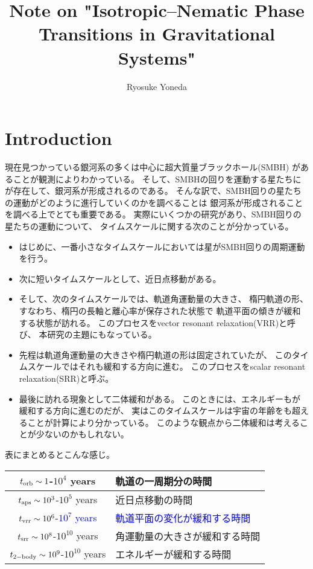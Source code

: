 \documentclass[10pt, pre, twocolumn, showpacs, aps]{revtex4-1}
\newcommand{\blue}[1]{\textcolor{blue}{#1}}
\begin{document}
\title{Note on "Isotropic--Nematic Phase Transitions in Gravitational Systems"}
\author{Ryosuke Yoneda}
\maketitle

\section{Introduction}
現在見つかっている銀河系の多くは中心に超大質量ブラックホール(SMBH)
があることが観測によりわかっている。
そして、SMBHの回りを運動する星たちにが存在して、銀河系が形成されるのである。
そんな訳で、SMBH回りの星たちの運動がどのように進行していくのかを調べることは
銀河系が形成されることを調べる上でとても重要である。
実際にいくつかの研究があり、SMBH回りの星たちの運動について、
タイムスケールに関する次のことが分かっている。
\begin{itemize}
\item はじめに、一番小さなタイムスケールにおいては星がSMBH回りの周期運動を行う。
\item 次に短いタイムスケールとして、近日点移動がある。
\item そして、次のタイムスケールでは、軌道角運動量の大きさ、
楕円軌道の形、すなわち、楕円の長軸と離心率が保存された状態で
軌道平面の傾きが緩和する状態が訪れる。
このプロセスをvector resonant relaxation(VRR)と呼び、
本研究の主題にもなっている。
\item 先程は軌道角運動量の大きさや楕円軌道の形は固定されていたが、	
このタイムスケールではそれも緩和する方向に進む。
このプロセスをscalar resonant relaxation(SRR)と呼ぶ。
\item 最後に訪れる現象として二体緩和がある。
このときには、エネルギーもが緩和する方向に進むのだが、
実はこのタイムスケールは宇宙の年齢をも超えることが計算により分かっている。
このような観点から二体緩和は考えることが少ないのかもしれない。	
\end{itemize}
表にまとめるとこんな感じ。
\begin{table}[H]
\begin{tabular}{|c|l|}\hline
	$t_{\rm orb}\sim1$-$10^4$ years & 軌道の一周期分の時間\\ \hline
	$t_{\rm aps}\sim10^3$-$10^5$ years & 近日点移動の時間\\ \hline
	\blue{$t_{\rm vrr}\sim10^6$-$10^7$ years} & \blue{軌道平面の変化が緩和する時間}\\ \hline
	$t_{\rm srr}\sim10^8$-$10^{10}$ years & 角運動量の大きさが緩和する時間\\ \hline
	$t_{\rm 2-body}\sim10^9$-$10^{10}$ years & エネルギーが緩和する時間\\ \hline
\end{tabular}
\end{table}
\end{document}
